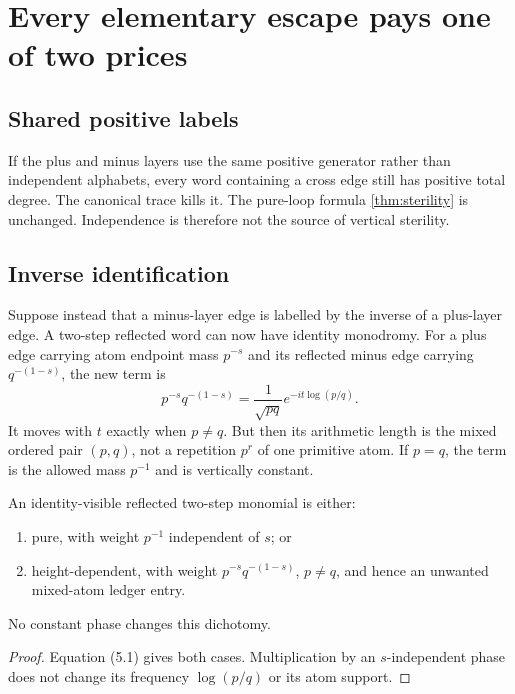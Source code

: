 \section{Every elementary escape pays one of two prices}
\label{sec:controls}

\subsection{Shared positive labels}

If the plus and minus layers use the same positive generator rather than
independent alphabets, every word containing a cross edge still has positive
total degree.  The canonical trace kills it.  The pure-loop formula
\cref{thm:sterility} is unchanged.  Independence is therefore not the source
of vertical sterility.

\subsection{Inverse identification}

Suppose instead that a minus-layer edge is labelled by the inverse of a
plus-layer edge.  A two-step reflected word can now have identity monodromy.
For a plus edge carrying atom endpoint mass $p^{-s}$ and its reflected minus
edge carrying $q^{-(1-s)}$, the new term is
\[
 p^{-s}q^{-(1-s)}
 =\frac{1}{\sqrt{pq}}
 e^{-it\log(p/q)}.                           \tag{5.1}
\]
It moves with $t$ exactly when $p\ne q$.  But then its arithmetic length is
the mixed ordered pair $(p,q)$, not a repetition $p^r$ of one primitive atom.
If $p=q$, the term is the allowed mass $p^{-1}$ and is vertically constant.

\begin{proposition}
\label{prop:two-step}
An identity-visible reflected two-step monomial is either:
\begin{enumerate}
 \item pure, with weight $p^{-1}$ independent of $s$; or
 \item height-dependent, with weight $p^{-s}q^{-(1-s)}$, $p\ne q$, and hence
       an unwanted mixed-atom ledger entry.
\end{enumerate}
No constant phase changes this dichotomy.
\end{proposition}

\begin{proof}
Equation (5.1) gives both cases.  Multiplication by an $s$-independent phase
does not change its frequency $\log(p/q)$ or its atom support.
\end{proof}

